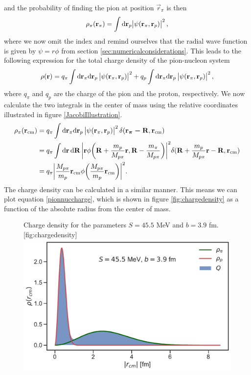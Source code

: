and the probability of finding the pion at position $\vec{r}_\pi$ is then
\begin{equation}\label{posirpi}
	\rho_\pi(\bm{\mathrm{r}}_\pi) = \int \text{d}\bm{\mathrm{r}}_p \abs{\psi(\bm{\mathrm{r}}_\pi,\bm{\mathrm{r}}_p)}^2,
\end{equation}
where we now omit the index and remind ourselves that the radial wave function is given by $\psi=r\phi$ from section \ref{sec:numericalconsiderations}. This leads to the following expression for the total charge density of the pion-nucleon system
\begin{equation}\label{pionnuccharge}
	\rho(\bm{\mathrm{r}}) = q_\pi \int \text{d}\bm{\mathrm{r}}_\pi \text{d}\bm{\mathrm{r}}_p \, \abs{\psi(\bm{\mathrm{r}}_\pi,\bm{\mathrm{r}}_p)}^2+q_p \int \text{d}\bm{\mathrm{r}}_\pi \text{d}\bm{\mathrm{r}}_p \, \abs{\psi(\bm{\mathrm{r}}_\pi,\bm{\mathrm{r}}_p)}^2,
\end{equation}
where $q_\pi$ and $q_p$ are the charge of the pion and the proton, respectively. We now calculate the two integrals in the center of mass using the relative coordinates illustrated in figure \ref{JacobiIllustration}.
\begin{align}
	\rho_\pi(\bm{\mathrm{r}}_\text{cm}) &= q_\pi \int \text{d}\bm{\mathrm{r}}_\pi \text{d} \bm{\mathrm{r}}_p \, \abs{\psi(\bm{\mathrm{r}}_\pi,\bm{\mathrm{r}}_p)}^2 \delta(\bm{\mathrm{r_\pi-\bm{\mathrm{R}}}},\bm{\mathrm{r}}_\text{cm}) \\
	&= q_\pi \int \text{d}\bm{\mathrm{r}} \,\text{d}\bm{\mathrm{R}} \, \bigg\lvert\bm{\mathrm{r}}\phi\bigg(\bm{\mathrm{R}}+\frac{m_p}{M_{p\pi}}\bm{\mathrm{r}},\bm{\mathrm{R}}-\frac{m_\pi}{M_{p\pi}}\bigg)\bigg\rvert^2 \delta(\bm{\mathrm{R}}+\frac{m_p}{M_{p\pi}}\bm{\mathrm{r}}-\bm{\mathrm{R}},\bm{\mathrm{r}}_\text{cm}) \\
	&= q_\pi \bigg \lvert\frac{M_{p\pi}}{m_p}\bm{\mathrm{r}}_\text{cm}\phi\bigg(\frac{M_{p\pi}}{m_p}\bm{\mathrm{r}}_{\text{cm}}\bigg) \bigg\rvert^2.
\end{align}
The charge density can be calculated in a similar manner. This means we can plot equation \eqref{pionnuccharge}, which is shown in figure \ref{fig:chargedensity} as a function of the absolute radius from the center of mass.
\begin{figure}[H]
	\begin{sidecaption}{Charge density for the parameters $S=45.5$ MeV and $b=3.9$ fm.}[fig:chargedensity]
		\includegraphics[width=\linewidth]{Figures/ChargeDensity.pdf} 
	\end{sidecaption}
\end{figure}

